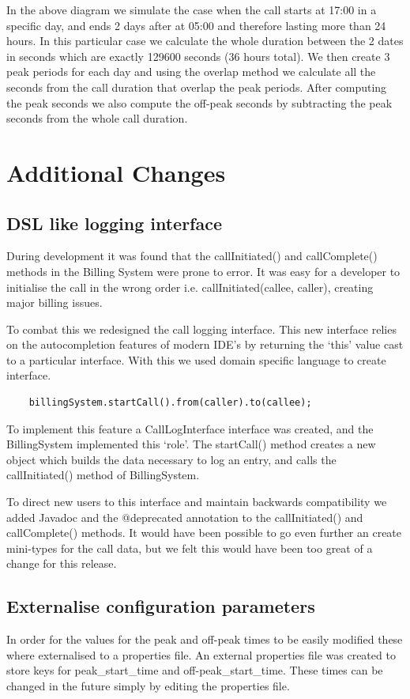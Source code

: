 \documentclass[pdftex,11pt,a4paper]{article}
\begin{document}
In the above diagram we simulate the case when the call starts at 17:00 in a specific day, and ends 2 days after at 05:00 and therefore lasting more than 24 hours. In this particular case we calculate the whole duration between the 2 dates in seconds which are exactly 129600 seconds (36 hours total). We then create 3 peak periods for each day and using the overlap method we calculate all the seconds from the call duration that overlap the peak periods. After computing the peak seconds we also compute the off-peak seconds by subtracting the peak seconds from the whole call duration.
\section{Additional Changes}

\subsection{DSL like logging interface}
During development it was found that the callInitiated() and callComplete() methods in the Billing System were prone to error. It was easy for a developer to initialise the call in the wrong order i.e. callInitiated(callee, caller), creating major billing issues.

To combat this we redesigned the call logging interface. This new interface relies on the autocompletion features of modern IDE’s by returning the ‘this’ value cast to a particular interface. With this we used domain specific language to create interface.
\begin{lstlisting}
	billingSystem.startCall().from(caller).to(callee);
\end{lstlisting}
To implement this feature a CallLogInterface interface was created, and the BillingSystem implemented this ‘role’. The startCall() method creates a new object which builds the data necessary to log an entry, and calls the callInitiated() method of BillingSystem.

To direct new users to this interface and maintain backwards compatibility we added Javadoc and the @deprecated annotation to the callInitiated()  and callComplete() methods. It would have been possible to go even further an create mini-types for the call data, but we felt this would have been too great of a change for this release.

\subsection{Externalise configuration parameters}
In order for the values for the peak and off-peak times to be easily modified these where externalised to a properties file. An external properties file was created to store keys for peak\_start\_time and off-peak\_start\_time. These times can be changed in the future simply by editing the properties file.
\end{document}
